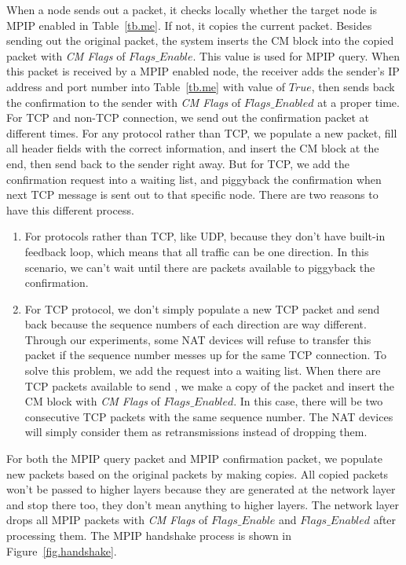 When a node sends out a packet, it checks locally whether the target node is MPIP enabled in Table~\ref{tb.me}. If not, it 
copies the current packet. Besides sending out the original packet, the system inserts the CM block into the copied packet with \emph{CM Flags} of $Flags\_Enable$. This value is used for MPIP query. When this packet is received by a MPIP enabled node, the receiver adds the sender's IP address and port number into Table~\ref{tb.me} with value of $True$, then sends back the confirmation to the sender with \emph{CM Flags} of $Flags\_Enabled$ at a proper time. For TCP and non-TCP connection, we send out the confirmation packet at different times. For any protocol rather than TCP, we populate a new packet, fill all header fields with the correct information, and insert the CM block at the end, then send back to the sender right away. But for TCP, we add the confirmation request into a waiting list, and piggyback the confirmation when next TCP message is sent out to that specific node. There are two reasons to have this different process. 

\begin{enumerate}
\item For protocols rather than TCP, like UDP, because they don't have built-in feedback loop, which means that all traffic can be one direction. In this scenario, we can't wait until there are packets available to piggyback the confirmation.

\item For TCP protocol, we don't simply populate a new TCP packet and send back because the sequence numbers of each direction are way different. Through our experiments, some NAT devices will refuse to transfer this packet if the sequence number messes up for the same TCP connection. To solve this problem, we add the request into a waiting list. When there are TCP packets available to send , we make a copy of the packet and insert the CM block with \emph{CM Flags} of $Flags\_Enabled$. In this case, there will be two consecutive TCP packets with the same sequence number. The NAT devices will simply consider them as retransmissions instead of dropping them.
\end{enumerate}

For both the MPIP query packet and MPIP confirmation packet, we populate new packets based on the original packets by making copies. All copied packets won't be passed to higher layers because they are generated at the network layer and stop there too, they don't mean anything to higher layers. The network layer drops all MPIP packets with \emph{CM Flags} of $Flags\_Enable$ and $Flags\_Enabled$ after processing them. The MPIP handshake process is shown in Figure~\ref{fig.handshake}.

